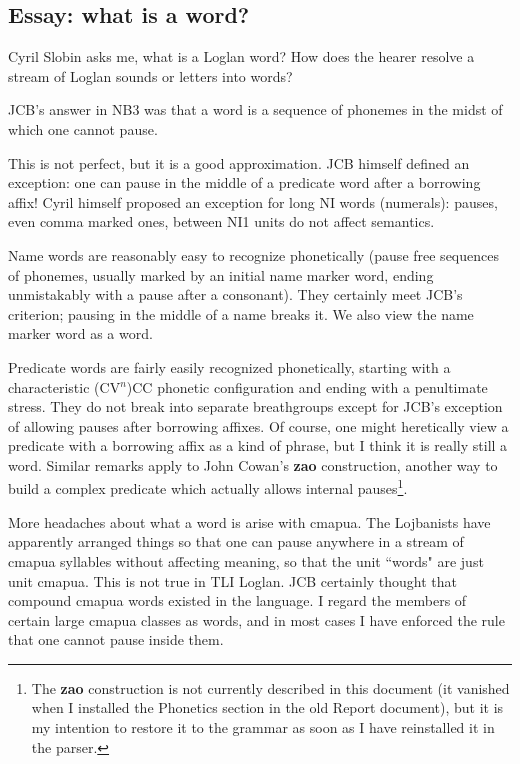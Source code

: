 \documentclass[12pt]{book}
\begin{document}
{\subsection{Essay:  what is a word?}

Cyril Slobin asks me, what is a Loglan word?  How does the hearer resolve a stream of Loglan sounds or letters into words?

JCB's answer in NB3 was that a word is a sequence of phonemes in the midst of which one cannot pause.

This is not perfect, but it is a good approximation.   JCB himself defined an exception:  one can pause in the middle of a predicate word after a borrowing affix!  Cyril himself proposed an exception for long NI words (numerals):  pauses, even comma marked ones, between NI1 units do not affect semantics.

Name words are reasonably easy to recognize phonetically (pause free sequences of phonemes, usually marked by an initial name marker word, ending
unmistakably with a pause after a consonant).  They certainly meet JCB's criterion; pausing in the middle of a name breaks it.   We also view the name marker word as a word.

Predicate words are fairly easily recognized phonetically, starting with a characteristic (CV$^n$)CC phonetic configuration and ending with a penultimate stress.  They do not break into separate breathgroups except for JCB's exception of allowing pauses after borrowing affixes.  Of course, one might heretically view a predicate with a borrowing affix as a kind of phrase, but I think it is really still a word.   Similar remarks apply to 
John Cowan's {\bf zao} construction, another way to build a complex predicate which actually allows internal pauses\footnote{The {\bf zao} construction is not currently described in this document (it vanished when I installed the Phonetics section in the old Report document), but it is my intention to restore it to the grammar as soon as I have reinstalled it in the parser.}.

More headaches about what a word is arise with cmapua.   The Lojbanists have apparently arranged things so that one can pause anywhere in a stream of cmapua syllables without affecting meaning, so that the unit ``words" are just unit cmapua.  This is not true in TLI Loglan.   JCB certainly thought that compound cmapua words existed in the language.  I regard the members of certain large cmapua classes as words, and in most cases
I have enforced the rule that one cannot pause inside them.  

}
\end{document}
